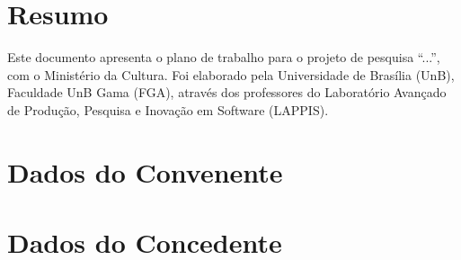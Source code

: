 \section*{Resumo}

Este documento apresenta o plano de trabalho para o projeto de pesquisa
``...'', com o Ministério da Cultura. Foi elaborado
pela Universidade de Brasília (UnB), Faculdade UnB Gama (FGA), através dos professores do
Laboratório Avançado de Produção, Pesquisa e Inovação em Software (LAPPIS).


\newpage
\section*{Dados do Convenente}


\begin{table}[!htb]
 
\label{tabela-convenente}
\end{table}



\section*{Dados do Concedente}


\begin{table}[!htb]
 
\label{tabela-concedente}
\end{table}





